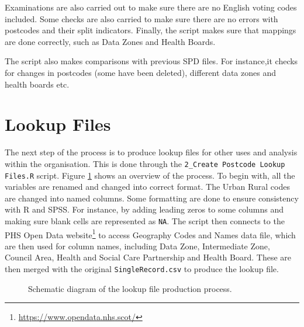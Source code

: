 \documentclass[12pt]{article}
\newcommand{\R}{{\sc R}\xspace}
\newcommand{\spss}{{\sc SPSS}\xspace}
\begin{document}
Examinations are also
carried out to make sure there are no English voting codes included. Some checks are also carried to make sure
there are no errors with postcodes and their
split indicators.
Finally, the script makes sure that mappings are done correctly,
such as Data Zones and Health Boards.

The script also makes comparisons with previous SPD files.
For instance,it checks for changes in postcodes
(some have been deleted), different data zones and
health boards etc.

 
\section{Lookup Files}
The next step of the process is to produce lookup files for
other uses and analysis within the organisation. This is done through the \texttt{2\_Create Postcode Lookup Files.R} script. Figure \ref{fig:block2} shows an overview of the process. To begin
with, all the variables are renamed and changed into
correct format. The Urban Rural codes are changed into
named columns. Some formatting are done to ensure
consistency with \R and \spss. For instance, by adding
leading zeros to some columns and making sure
blank cells are represented as \texttt{NA}. The script
then connects to the PHS Open Data website\footnote{\url{https://www.opendata.nhs.scot/}}   
to access Geography Codes and Names data file,
which are then used for column names, including
Data Zone, Intermediate Zone, Council Area,
Health and Social Care Partnership and Health Board.
These are then merged with the original
\texttt{SingleRecord.csv} to produce the lookup file.

\begin{figure}[h!]
{}
\caption{Schematic diagram of the lookup file production process.}\label{fig:block2}
\end{figure}
\end{document}
